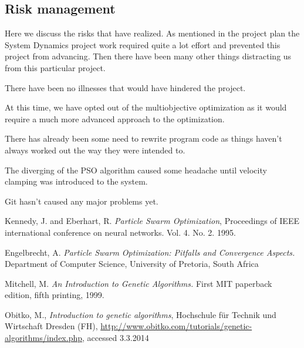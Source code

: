 \documentclass[twoside]{article}
\begin{document}
\begin{multicols}{2}

\section{Risk management}

Here we discuss the risks that have realized. As mentioned in the project plan the System Dynamics project work required quite a lot effort and prevented this project from advancing. Then there have been many other things distracting us from this particular project.

There have been no illnesses that would have hindered the project.

At this time, we have opted out of the multiobjective optimization as it would require a much more advanced approach to the optimization.

There has already been some need to rewrite program code as things haven't always worked out the way they were intended to.

The diverging of the PSO algorithm caused some headache until velocity clamping was introduced to the system. 

Git hasn't caused any major problems yet.



\begin{thebibliography}{99} %

 Kennedy, J. and Eberhart, R.
  \emph{Particle Swarm Optimization},
 Proceedings of IEEE international conference on neural networks. Vol. 4. No. 2. 1995. 
 
 Engelbrecht, A. \emph{Particle Swarm Optimization: Pitfalls and Convergence Aspects.}
 Department of Computer Science, University of Pretoria, South Africa
 
Mitchell, M. \emph{An Introduction to Genetic Algorithms.} First MIT paperback edition, fifth printing, 1999. 
 
Obitko, M., \emph{Introduction to genetic algorithms}, Hochschule f\"ur Technik und Wirtschaft Dresden (FH), \url{http://www.obitko.com/tutorials/genetic-algorithms/index.php}, accessed 3.3.2014

 
\end{thebibliography}

\end{multicols}
\end{document}
